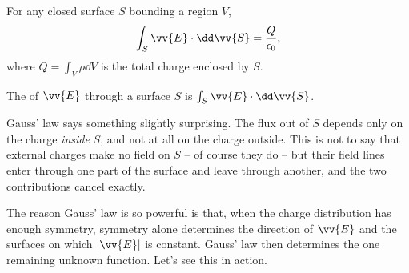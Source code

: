 \begin{law}
	For any closed surface $S$ bounding a region $V$,
	$$
	\int_S \vv{E} \cdot \dd \vv{S} = \frac{Q}{\epsilon_0},
	$$
	where $Q = \int_V \rho \dd V$ is the total charge enclosed by $S$.
\end{law}

\begin{definition}[Flux]
	The  of $\vv{E}$ through a surface $S$ is $\int_S \vv{E}\cdot \dd \vv{S}$.
\end{definition}

Gauss' law says something slightly surprising. The flux out of $S$ depends only on the charge \emph{inside} $S$, and not at all on the charge outside. This is not to say that external charges make no field on $S$ -- of course they do -- but their field lines enter through one part of the surface and leave through another, and the two contributions cancel exactly.

The reason Gauss' law is so powerful is that, when the charge distribution has enough symmetry, symmetry alone determines the direction of $\vv{E}$ and the surfaces on which $|\vv{E}|$ is constant. Gauss' law then determines the one remaining unknown function. Let's see this in action.

